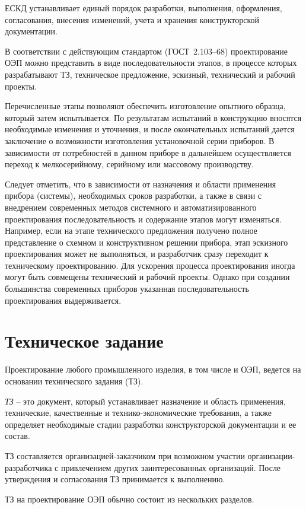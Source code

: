 ЕСКД устанавливает единый порядок разработки, выполнения, оформления, согласования, внесения изменений, учета и хранения конструкторской документации.

В соответствии с действующим стандартом (ГОСТ~2.103–68) проектирование ОЭП можно представить в виде последовательности этапов, в процессе которых разрабатывают ТЗ, техническое предложение, эскизный, технический и рабочий проекты.

Перечисленные этапы позволяют обеспечить изготовление опытного образца, который затем испытывается. По результатам испытаний в конструкцию вносятся необходимые изменения и уточнения, и после окончательных испытаний дается заключение о возможности изготовления установочной серии приборов. В зависимости от потребностей в данном приборе в дальнейшем осуществляется переход к мелкосерийному, серийному или массовому производству.

Следует отметить, что в зависимости от назначения и области применения прибора (системы), необходимых сроков разработки, а также в связи с внедрением современных методов системного и автоматизированного проектирования последовательность и содержание этапов могут изменяться. Например, если на этапе технического предложения получено полное представление о схемном и конструктивном решении прибора, этап эскизного проектирования может не выполняться, и разработчик сразу переходит к техническому проектированию. Для ускорения процесса проектирования иногда могут быть совмещены технический и рабочий проекты. Однако при создании большинства современных приборов указанная последовательность проектирования выдерживается.

\section{Техническое задание}
Проектирование любого промышленного изделия, в том числе и ОЭП, ведется на основании технического задания (ТЗ).

\textit{ТЗ} -- это документ, который устанавливает назначение и область применения, технические, качественные и технико-экономические требования, а также определяет необходимые стадии разработки конструкторской документации и ее состав.

ТЗ составляется организацией-заказчиком при возможном участии организации-разработчика с привлечением других заинтересованных организаций. После утверждения и согласования ТЗ принимается к выполнению.

ТЗ на проектирование ОЭП обычно состоит из нескольких разделов.

